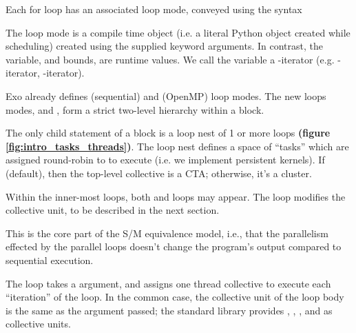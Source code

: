 \filbreak
{}

\begin{figure*}[!b]

\caption{Simple vector addition example. We break  and  into chunks of 128 values, each handled by one ``task''.}
\label{fig:intro_tasks_threads}
\end{figure*}

Each for loop has an associated loop mode, conveyed using the syntax



The loop mode is a compile time object (i.e. a literal Python object created while scheduling) created using the supplied keyword arguments.
In contrast, the  variable, and  bounds, are runtime values.
We call the  variable a -iterator (e.g. -iterator, -iterator).

\filbreak
Exo already defines  (sequential) and  (OpenMP) loop modes.
The new loops modes,  and , form a strict two-level hierarchy within a  block.

\filbreak
The only child statement of a  block is a loop nest of 1 or more  loops \textbf{(figure \ref{fig:intro_tasks_threads})}.
The loop nest defines a space of ``tasks'' which are assigned round-robin to  to execute (i.e. we implement persistent kernels).
If  (default), then the top-level collective is a CTA; otherwise, it's a cluster.

\filbreak
Within the inner-most  loops, both  and  loops may appear.
The  loop modifies the collective unit, to be described in the next section.

 This is the core part of the S/M equivalence model, i.e., that the parallelism effected by the parallel loops doesn't change the program's output compared to sequential execution.

\filbreak
{}



The  loop takes a  argument, and assigns one thread collective to execute each ``iteration'' of the loop.
In the common case, the collective unit of the loop body is the same as the  argument passed; the standard library provides , , , and  as collective units.

